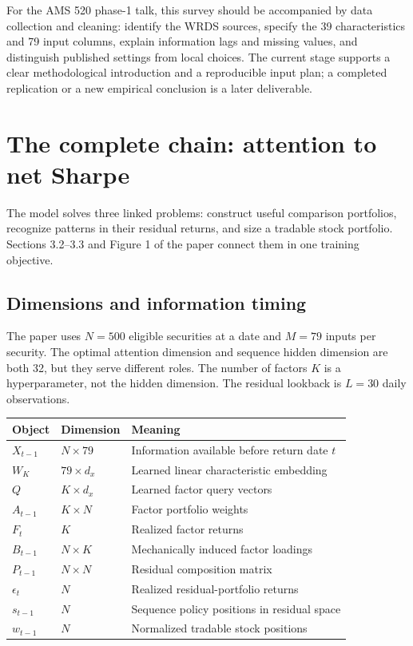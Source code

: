 \documentclass[11pt]{article}
\begin{document}
For the AMS 520 phase-1 talk, this survey should be accompanied by
data collection and cleaning: identify the WRDS sources, specify
the 39 characteristics and 79 input columns, explain information
lags and missing values, and distinguish published settings from
local choices. The current stage supports a clear methodological
introduction and a reproducible input plan; a completed replication
or a new empirical conclusion is a later deliverable.

\section{The complete chain: attention to net Sharpe}
\label{sec:model-chain}

The model solves three linked problems: construct useful comparison
portfolios, recognize patterns in their residual returns, and size a
tradable stock portfolio. Sections 3.2--3.3 and Figure 1 of the paper
connect them in one training objective.

\subsection{Dimensions and information timing}
\label{sec:dimensions}

The paper uses $N=500$ eligible securities at a date and $M=79$ inputs
per security. The optimal attention dimension and sequence hidden
dimension are both 32, but they serve different roles. The number of
factors $K$ is a hyperparameter, not the hidden dimension. The residual
lookback is $L=30$ daily observations.

\begin{center}
\small
\begin{tabular}{lll}
\toprule
Object & Dimension & Meaning\\
\midrule
$X_{t-1}$ & $N\times79$ & Information available before return date $t$\\
$W_K$ & $79\times d_x$ & Learned linear characteristic embedding\\
$Q$ & $K\times d_x$ & Learned factor query vectors\\
$A_{t-1}$ & $K\times N$ & Factor portfolio weights\\
$F_t$ & $K$ & Realized factor returns\\
$B_{t-1}$ & $N\times K$ & Mechanically induced factor loadings\\
$P_{t-1}$ & $N\times N$ & Residual composition matrix\\
$\epsilon_t$ & $N$ & Realized residual-portfolio returns\\
$s_{t-1}$ & $N$ & Sequence policy positions in residual space\\
$w_{t-1}$ & $N$ & Normalized tradable stock positions\\
\bottomrule
\end{tabular}
\end{center}
\end{document}
